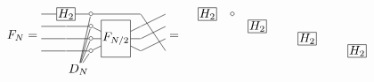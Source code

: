 \[
F_N =
\begin{tikzpicture}[baseline=-2em, x=2em, y=1em, inner sep=1pt]
    \node[rectangle,draw] (H) at (0,0) {$H_2$};
    \node[inner sep=0pt, minimum size=0pt] (l1) at (0,-1) {};
    \node[inner sep=0pt, minimum size=0pt] (l2) at (0,-2) {};
    \node[inner sep=0pt, minimum size=0pt] (l3) at (0,-3) {};
    \node[inner sep=0pt, minimum size=0pt] (L0) at (-1,0) {};
    \node[inner sep=0pt, minimum size=0pt] (L1) at (-1,-1) {};
    \node[inner sep=0pt, minimum size=0pt] (L2) at (-1,-2) {};
    \node[inner sep=0pt, minimum size=0pt] (L3) at (-1,-3) {};
    \node[inner sep=0pt, minimum size=0pt] (b0) at (1,0) {$\sbullet$};
    \node[inner sep=0pt, minimum size=0pt] (b1) at (1,-1) {$\sbullet$};
    \node[inner sep=0pt, minimum size=0pt] (b2) at (1,-2) {$\sbullet$};
    \node[inner sep=0pt, minimum size=0pt] (b3) at (1,-3) {$\sbullet$};
    \node (D) at (.5,-4.5) {$D_N$};
    \node[rectangle,draw,minimum height=3em] (F) at (2,-2) {$F_{N/2}$};
    \node[inner sep=0pt, minimum size=0pt] (r0) at (4,0) {};
    \node[inner sep=0pt, minimum size=0pt] (r1) at (4,-1) {};
    \node[inner sep=0pt, minimum size=0pt] (r2) at (4,-2) {};
    \node[inner sep=0pt, minimum size=0pt] (r3) at (4,-3) {};
    \node[inner sep=0pt, minimum size=0pt] (s0) at (3,0) {};
    \node[inner sep=0pt, minimum size=0pt] (s1) at (3,-1) {};
    \node[inner sep=0pt, minimum size=0pt] (s2) at (3,-2) {};
    \node[inner sep=0pt, minimum size=0pt] (s3) at (3,-3) {};
    \draw (b0) -- (D);
    \draw (b1) -- (D);
    \draw (b2) -- (D);
    \draw (b3) -- (D);
    \draw (L0) -- (H) -- (b0) -- (s0) -- (r3);
    \draw (L1) -- (l1) -- (b1) -- (F) -- (s1) -- (r0);
    \draw (L2) -- (l2) -- (b2) -- (F) -- (s2) -- (r1);
    \draw (L3) -- (l3) -- (b3) -- (F) -- (s3) -- (r2);
\end{tikzpicture}
=
\begin{tikzpicture}[baseline=-2em, x=2em, y=1em, inner sep=1pt]
    \node[rectangle,draw] (H) at (0,0) {$H_2$};
    \node[rectangle,draw] (H2) at (2,-1) {$H_2$};
    \node[rectangle,draw] (H3) at (4,-2) {$H_2$};
    \node[rectangle,draw] (H4) at (6,-3) {$H_2$};
    \node[inner sep=0pt, minimum size=0pt] (l1) at (0,-1) {};
    \node[inner sep=0pt, minimum size=0pt] (l2) at (0,-2) {};
    \node[inner sep=0pt, minimum size=0pt] (l3) at (0,-3) {};
    \node[inner sep=0pt, minimum size=0pt] (L0) at (-1,0) {};
    \node[inner sep=0pt, minimum size=0pt] (L1) at (-1,-1) {};
    \node[inner sep=0pt, minimum size=0pt] (L2) at (-1,-2) {};
    \node[inner sep=0pt, minimum size=0pt] (L3) at (-1,-3) {};
    \node[inner sep=0pt, minimum size=0pt] (b0) at (1,0) {$\sbullet$};

\end{tikzpicture}\]
